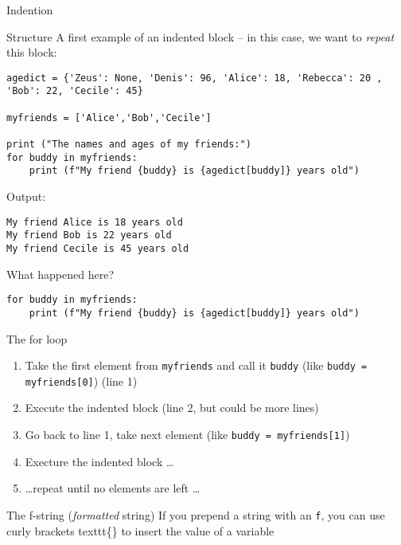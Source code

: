 \documentclass[compress]{beamer}
\begin{document}
\begin{frame}[fragile]{Indention}
\begin{block}{Structure}
	A first example of an indented block -- in this case, we want to \emph{repeat} this block:
\end{block}
\begin{lstlisting}
agedict = {'Zeus': None, 'Denis': 96, 'Alice': 18, 'Rebecca': 20 , 'Bob': 22, 'Cecile': 45}

myfriends = ['Alice','Bob','Cecile']

print ("The names and ages of my friends:")
for buddy in myfriends:
	print (f"My friend {buddy} is {agedict[buddy]} years old")
\end{lstlisting}

Output:
\begin{lstlisting}
My friend Alice is 18 years old
My friend Bob is 22 years old
My friend Cecile is 45 years old
\end{lstlisting}
\end{frame}

\begin{frame}[fragile]{What happened here?}

\begin{lstlisting}
for buddy in myfriends:
    print (f"My friend {buddy} is {agedict[buddy]} years old")
\end{lstlisting}

\small
	\begin{block}{The for loop}
\begin{enumerate}
	\item Take the first element from \texttt{myfriends} and call it \texttt{buddy} (like \texttt{buddy = myfriends[0]}) (line 1)
	\item Execute the indented block (line 2, but could be more lines)
	\item Go back to line 1, take next element  (like \texttt{buddy = myfriends[1]}) 
	\item Execture the indented block \ldots
	\item \ldots repeat until no elements are left \ldots
\end{enumerate}
	\end{block}
	
	\begin{block}{The f-string (\emph{formatted} string)}
If you prepend a string with an \texttt{f}, you can use curly brackets texttt{\{\}} to insert the value of a variable
	\end{block}
	
\end{frame}
\end{document}
